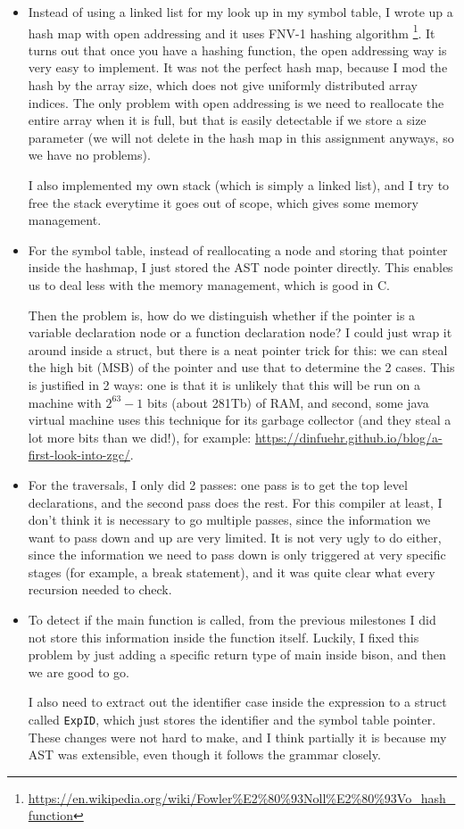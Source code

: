 \documentclass{article}
\begin{document}
\begin{itemize}
    \item Instead of using a linked list for my look up in my symbol table, I wrote up a hash map with open addressing and it uses FNV-1 hashing algorithm \footnote{ \url{https://en.wikipedia.org/wiki/Fowler\%E2\%80\%93Noll\%E2\%80\%93Vo_hash_function}}. 
        It turns out that once you have a hashing function, the open addressing way is very easy to implement. It was not the perfect hash map, because I mod the hash by the array size, which does not give uniformly distributed array indices. The only problem with open addressing is we need to reallocate the entire array when it is full, but that is easily detectable if we store a size parameter (we will not delete in the hash map in this assignment anyways, so we have no problems).

        I also implemented my own stack (which is simply a linked list), and I try to free the stack everytime it goes out of scope, which gives some memory management.
    \item For the symbol table, instead of reallocating a node and storing that pointer inside the hashmap, I just stored the AST node pointer directly. This enables us to deal less with the memory management, which is good in C.

        Then the problem is, how do we distinguish whether if the pointer is a variable declaration node or a function declaration node? I could just wrap it around inside a struct, but there is a neat pointer trick for this: we can steal the high bit (MSB) of the pointer and use that to determine the 2 cases. This is justified in 2 ways: one is that it is unlikely that this will be run on a machine with $2^63-1$ bits  (about 281Tb) of RAM, and second, some java virtual machine uses this technique for its garbage collector (and they steal a lot more bits than we did!), for example: \url{https://dinfuehr.github.io/blog/a-first-look-into-zgc/}.
    \item For the traversals, I only did 2 passes: one pass is to get the top level declarations, and the second pass does the rest. For this compiler at least, I don't think it is necessary to go multiple passes, since the information we want to pass down and up are very limited. It is not very ugly to do either, since the information we need to pass down is only triggered at very specific stages (for example, a break statement), and it was quite clear what every recursion needed to check.
    \item To detect if the main function is called, from the previous milestones I did not store this information inside the function itself. Luckily, I fixed this problem by just adding a specific return type of main inside bison, and then we are good to go. 

        I also need to extract out the identifier case inside the expression to a struct called \verb|ExpID|, which just stores the identifier and the symbol table pointer. These changes were not hard to make, and I think partially it is because my AST was extensible, even though it follows the grammar closely.
\end{itemize}
\end{document}
